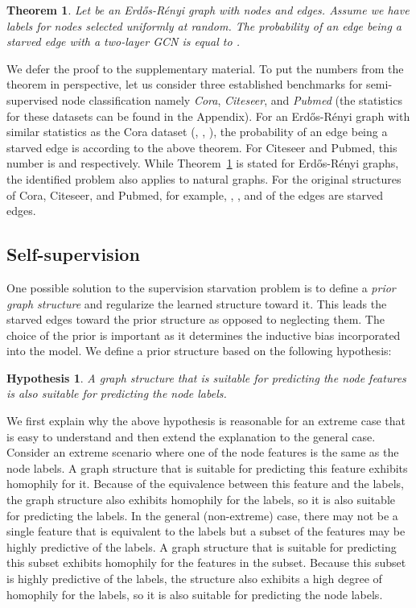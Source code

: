 \documentclass{article}
\newtheorem{theorem}{Theorem}
\newtheorem{hypothesis}{Hypothesis}
\begin{document}
\begin{theorem} \label{thrm}
Let  be an Erd\H{o}s-R\'enyi graph with  nodes and  edges. Assume we have labels for  nodes selected uniformly at random. 
The probability of an edge being a starved edge with a two-layer GCN is equal to .
\end{theorem}

We defer the proof to the supplementary material. 
To put the numbers from the theorem in perspective, let us consider three established benchmarks for semi-supervised node classification namely \emph{Cora}, \emph{Citeseer}, and \emph{Pubmed} (the statistics for these datasets can be found in the Appendix). For an Erd\H{o}s-R\'enyi graph with similar statistics as the Cora dataset (, , ),
the probability of an edge being a starved edge is  according to the above theorem. For Citeseer and Pubmed, this number is  and  respectively.
While Theorem~\ref{thrm} is stated for Erd\H{o}s-R\'enyi graphs, the identified problem also applies to natural graphs. For the original structures of Cora, Citeseer, and Pubmed, for example, , , and  of the edges are starved edges.

\subsection{Self-supervision} \label{sec:self-supervision}
One possible solution to the supervision starvation problem is to define a \emph{prior graph structure} and regularize the learned structure toward it. 
This leads the starved edges toward the prior structure as opposed to neglecting them.
The choice of the prior is important as it determines the inductive bias incorporated into the model.
We define a prior structure based on the following hypothesis:
\begin{hypothesis}
A graph structure that is suitable for predicting the node features is also suitable for predicting the node labels.
\end{hypothesis}
We first explain why the above hypothesis is reasonable for an extreme case that is easy to understand and then extend the explanation to the general case.
Consider an extreme scenario where one of the node features is the same as the node labels. A graph structure that is suitable for predicting this feature exhibits homophily for it. Because of the equivalence between this feature and the labels, the graph structure also exhibits homophily for the labels, so it is also suitable for predicting the labels. In the general (non-extreme) case, there may not be a single feature that is equivalent to the labels but a subset of the features may be highly predictive of the labels. A graph structure that is suitable for predicting this subset exhibits homophily for the features in the subset. Because this subset is highly predictive of the labels, the structure also exhibits a high degree of homophily for the labels, so it is also suitable for predicting the node labels.
\end{document}
